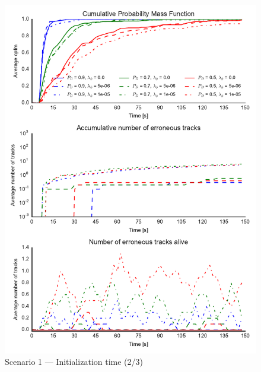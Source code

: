 \begin{figure}
\centering
\includegraphics{Figures/plots/Scenario1_Init-Time(2-3).pdf}
\caption{Scenario 1 --- Initialization time (2/3)}\label{fig:init1_time_2-3}
\end{figure}


